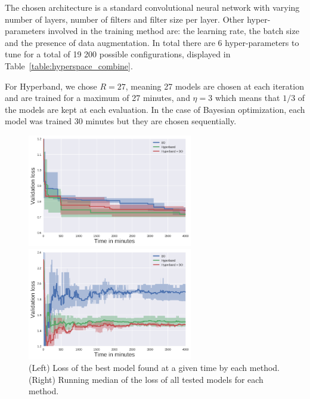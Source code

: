 The chosen architecture is a standard convolutional neural network with varying number of layers, number of filters and filter size per layer. Other hyper-parameters involved in the training method are: the learning rate, the batch size and the presence of data augmentation. In total there are 6 hyper-parameters to tune for a total of 19 200 possible configurations, displayed in Table~\ref{table:hyperspace_combine}.

For Hyperband, we chose $R = 27$, meaning 27 models are chosen at each iteration and are trained for a maximum of 27 minutes, and $\eta = 3$ which means that $1/3$ of the models are kept at each evaluation. In the case of Bayesian optimization, each model was trained $30$ minutes but they are chosen sequentially.

\begin{figure}[htb]
	\begin{minipage}[b]{.49\linewidth}
		\centering
		\centerline{\includegraphics[width=7.2cm]{img_hyperopt/cifar_10_aggregate_best_val_loss_per_minute}}
	\end{minipage}
	\begin{minipage}[b]{.49\linewidth}
		\centering
		\centerline{\includegraphics[width=7.2cm]{img_hyperopt/cifar_10_aggregate_median_val_loss_per_minute}}
	\end{minipage}
	\caption[Loss of the best model and running median of the loss as the methods progress]{(Left) Loss of the best model found at a given time by each method. (Right) Running median of the loss of all tested models for each method.}
	\label{fig:combining_loss}
\end{figure}

